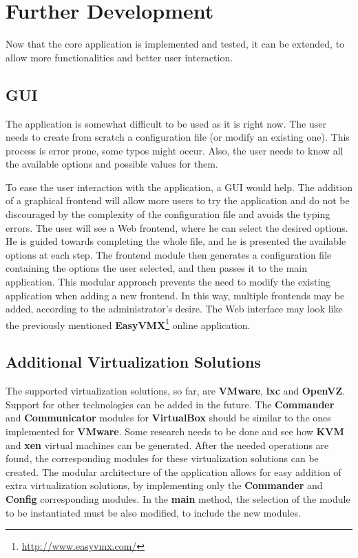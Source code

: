 \chapter{Further Development}
\label{chapter:future}
Now that the core application is implemented and tested, it can be extended, to
allow more functionalities and better user interaction.

\section{GUI}
\label{sec:future-gui}
The application is somewhat difficult to be used as it is right now. The user
needs to create from scratch a configuration file (or modify an existing one).
This process is error prone, some typos might occur. Also, the user needs to
know all the available options and possible values for them. 

To ease the user interaction with the application, a GUI would help.  The
addition of a graphical frontend will allow more users to try the application
and do not be discouraged by the complexity of the configuration file and
avoids the typing errors. The user will see a Web frontend, where he can select
the desired options. He is guided towards completing the whole file, and he is
presented the available options at each step. The frontend module then
generates a configuration file containing the options the user selected, and
then passes it to the main application. This modular approach prevents the need
to modify the existing application when adding a new frontend. In this way,
multiple frontends may be added, according to the \project administrator's
desire. The Web interface may look like the previously mentioned
\textbf{EasyVMX}\footnote{\url{http://www.easyvmx.com/}} online application.


\section{Additional Virtualization Solutions}
\label{sec:more-virt}
The supported virtualization solutions, so far, are \textbf{VMware},
\textbf{lxc} and \textbf{OpenVZ}. Support for other technologies can be added
in the future. The \textbf{Commander} and \textbf{Communicator} modules for
\textbf{VirtualBox} should be similar to the ones implemented for
\textbf{VMware}. Some research needs to be done and see how \textbf{KVM} and
\textbf{xen} virtual machines can be generated. After the needed operations are
found, the corresponding modules for these virtualization solutions can be
created. The modular architecture of the application allows for easy addition
of extra virtualization solutions, by implementing only the \textbf{Commander}
and \textbf{Config} corresponding modules. In the \textbf{main} method, the
selection of the module to be instantiated must be also modified, to include
the new modules.


